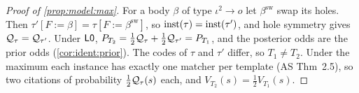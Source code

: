 \begin{proof}[Proof of \cref{prop:model:max}]
For a body $\beta$ of type $\iota^2\to o$ let $\beta^{\mathrm{sw}}$ swap its holes. Then $\tau'[F:=\beta]=\tau[F:=\beta^{\mathrm{sw}}]$, so $\mathrm{inst}(\tau)=\mathrm{inst}(\tau')$, and hole symmetry gives $\mathcal{Q}_\tau=\mathcal{Q}_{\tau'}$. Under $\mathord{\mathsf{L0}}$, $P_{T_2}=\tfrac12\mathcal{Q}_\tau+\tfrac12\mathcal{Q}_{\tau'}=P_{T_1}$, and the posterior odds are the prior odds (\cref{cor:ident:prior}). The codes of $\tau$ and $\tau'$ differ, so $T_1\ne T_2$. Under the maximum each instance has exactly one matcher per template (AS Thm~2.5), so two citations of probability $\tfrac12\mathcal{Q}_\tau(s)$ each, and $V_{T_2}(s)=\tfrac12V_{T_1}(s)$.
\end{proof}
